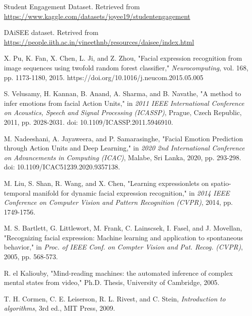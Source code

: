 \begin{thebibliography}{9}
    Student Engagement Dataset. Retrieved from 
    \url{https://www.kaggle.com/datasets/joyee19/studentengagement}

    DAiSEE dataset. Retrived from \url{https://people.iith.ac.in/vineethnb/resources/daisee/index.html}

     X. Pu, K. Fan, X. Chen, L. Ji, and Z. Zhou, "Facial expression recognition from image sequences using twofold random forest classifier," \textit{Neurocomputing}, vol. 168, pp. 1173-1180, 2015. https://doi.org/10.1016/j.neucom.2015.05.005
    
     S. Velusamy, H. Kannan, B. Anand, A. Sharma, and B. Navathe, "A method to infer emotions from facial Action Units," in \textit{2011 IEEE International Conference on Acoustics, Speech and Signal Processing (ICASSP)}, Prague, Czech Republic, 2011, pp. 2028-2031. doi: 10.1109/ICASSP.2011.5946910.
    
     M. Nadeeshani, A. Jayaweera, and P. Samarasinghe, "Facial Emotion Prediction through Action Units and Deep Learning," in \textit{2020 2nd International Conference on Advancements in Computing (ICAC)}, Malabe, Sri Lanka, 2020, pp. 293-298. doi: 10.1109/ICAC51239.2020.9357138.
    
     M. Liu, S. Shan, R. Wang, and X. Chen, "Learning expressionlets on spatio-temporal manifold for dynamic facial expression recognition," in \textit{2014 IEEE Conference on Computer Vision and Pattern Recognition (CVPR)}, 2014, pp. 1749-1756.
    
     M. S. Bartlett, G. Littlewort, M. Frank, C. Lainscsek, I. Fasel, and J. Movellan, "Recognizing facial expression: Machine learning and application to spontaneous behavior," in \textit{Proc. of IEEE Conf. on Compter Vision and Pat. Recog. (CVPR)}, 2005, pp. 568-573.
    
     R. el Kaliouby, "Mind-reading machines: the automated inference of complex mental states from video," Ph.D. Thesis, University of Cambridge, 2005.
    
     T. H. Cormen, C. E. Leiserson, R. L. Rivest, and C. Stein, \textit{Introduction to algorithms}, 3rd ed., MIT Press, 2009.

    
\end{thebibliography}
